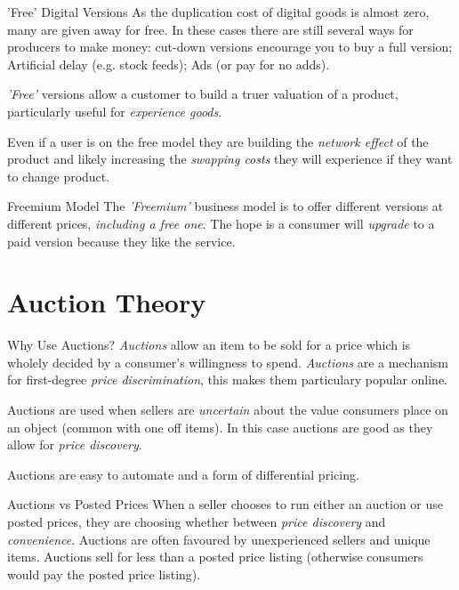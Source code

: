 \documentclass[11pt,a4paper]{article}
\begin{document}
\begin{remark}{'Free' Digital Versions}
  As the duplication cost of digital goods is almost zero, many are given away for free. In these cases there are still several ways for producers to make money: cut-down versions encourage you to buy a full version; Artificial delay (e.g. stock feeds); Ads (or pay for no adds).
  \par \textit{'Free'} versions allow a customer to build a truer valuation of a product, particularly useful for \textit{experience goods}.
  \par Even if a user is on the free model they are building the \textit{network effect} of the product and likely increasing the \textit{swapping costs} they will experience if they want to change product.
\end{remark}

\begin{proposition}{Freemium Model}
  The \textit{'Freemium'} business model is to offer different versions at different prices, \textit{including a free one}. The hope is a consumer will \textit{upgrade} to a paid version because they like the service.
\end{proposition}

\section{Auction Theory}

\begin{remark}{Why Use Auctions?}
  \textit{Auctions} allow an item to be sold for a price which is wholely decided by a consumer's willingness to spend. \textit{Auctions} are a mechanism for first-degree \textit{price discrimination}, this makes them particulary popular online.
  \par Auctions are used when sellers are \textit{uncertain} about the value consumers place on an object (common with one off items). In this case auctions are good as they allow for \textit{price discovery}.
  \par Auctions are easy to automate and a form of differential pricing.
\end{remark}

\begin{proposition}{Auctions vs Posted Prices}
  When a seller chooses to run either an auction or use posted prices, they are choosing whether between \textit{price discovery} and \textit{convenience}. Auctions are often favoured by unexperienced sellers and unique items. Auctions sell for less than a posted price listing (otherwise consumers would pay the posted price listing).
\end{proposition}
\end{document}
